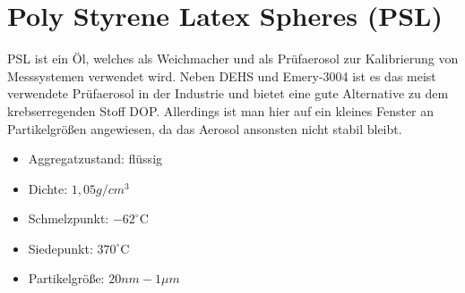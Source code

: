 \section{Poly Styrene Latex Spheres (PSL)}
PSL ist ein \"{O}l, welches als Weichmacher und als Pr\"{u}faerosol zur Kalibrierung von Messsystemen verwendet wird. Neben DEHS und Emery-3004 ist es das meist verwendete Pr\"{u}faerosol in der Industrie und bietet eine gute Alternative zu dem krebserregenden Stoff DOP. Allerdings ist man hier auf ein kleines Fenster an Partikelgr\"{o}{\ss}en angewiesen, da das Aerosol ansonsten nicht stabil bleibt.
\begin{itemize}
\item Aggregatzustand: fl\"{u}ssig
\item Dichte: \(1,05 g/cm^3\)
\item Schmelzpunkt: \(-62^\circ\text{C}\)
\item Siedepunkt: \(370^\circ\text{C}\)
\item Partikelgr\"{o}{\ss}e: \(20nm - 1\mu m\)
\end{itemize}